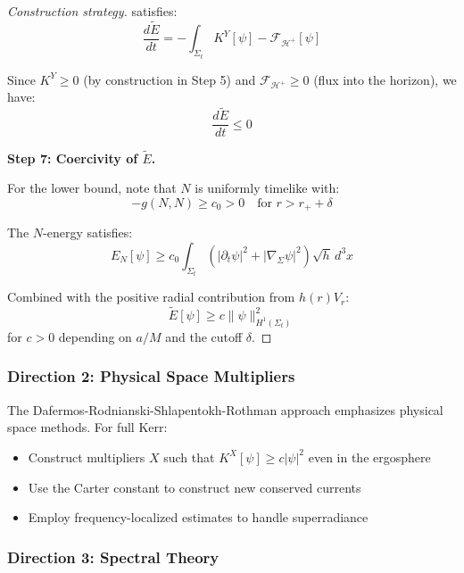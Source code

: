 \documentclass[12pt,a4paper]{article}
\begin{document}
\begin{proof}[Construction strategy]
satisfies:
\begin{equation}
\frac{d\tilde{E}}{dt} = -\int_{\Sigma_t} K^Y[\psi] - \mathcal{F}_{\mathcal{H}^+}[\psi]
\end{equation}

Since $K^Y \geq 0$ (by construction in Step 5) and $\mathcal{F}_{\mathcal{H}^+} \geq 0$ (flux into the horizon), we have:
\begin{equation}
\frac{d\tilde{E}}{dt} \leq 0
\end{equation}

\textbf{Step 7: Coercivity of $\tilde{E}$.}

For the lower bound, note that $N$ is uniformly timelike with:
\begin{equation}
-g(N, N) \geq c_0 > 0 \quad \text{for } r > r_+ + \delta
\end{equation}

The $N$-energy satisfies:
\begin{equation}
E_N[\psi] \geq c_0 \int_{\Sigma_t} (|\partial_t\psi|^2 + |\nabla_\Sigma\psi|^2) \sqrt{h}\, d^3x
\end{equation}

Combined with the positive radial contribution from $h(r)V_r$:
\begin{equation}
\tilde{E}[\psi] \geq c\|\psi\|_{H^1(\Sigma_t)}^2
\end{equation}
for $c > 0$ depending on $a/M$ and the cutoff $\delta$.
\end{proof}



\subsubsection{Direction 2: Physical Space Multipliers}

The Dafermos-Rodnianski-Shlapentokh-Rothman approach emphasizes physical space methods. For full Kerr:
\begin{itemize}
    \item Construct multipliers $X$ such that $K^X[\psi] \geq c|\psi|^2$ even in the ergosphere
    \item Use the Carter constant to construct new conserved currents
    \item Employ frequency-localized estimates to handle superradiance
\end{itemize}

\subsubsection{Direction 3: Spectral Theory}
\end{document}
